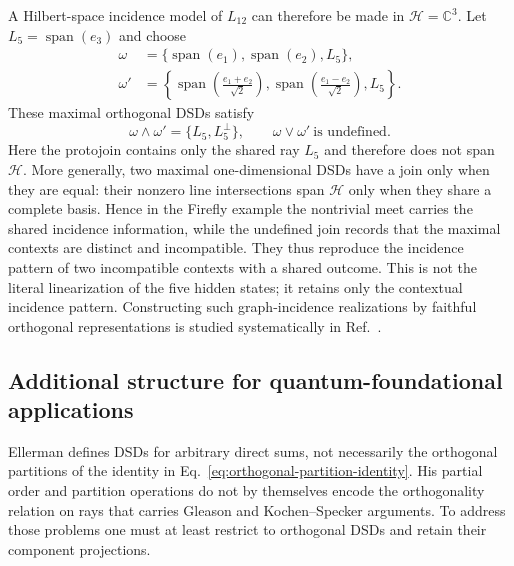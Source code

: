 \documentclass[aps,pra,reprint,nofootinbib]{revtex4-2}
\newcommand{\Span}{\operatorname{span}}
\begin{document}
A Hilbert-space incidence model of $L_{12}$ can therefore be made in
$\mathcal H=\mathbb C^3$.  Let $L_5=\Span(e_3)$ and choose
\begin{align}
  \omega&=\{\Span(e_1),\Span(e_2),L_5\},\\
  \omega'&=\left\{
  \Span\!\left(\frac{e_1+e_2}{\sqrt2}\right),
  \Span\!\left(\frac{e_1-e_2}{\sqrt2}\right),L_5\right\}.
  \label{eq:firefly-hilbert-contexts}
\end{align}
These maximal orthogonal DSDs satisfy
\begin{equation}
  \omega\wedge\omega'=\{L_5,L_5^\perp\},
  \qquad
  \omega\vee\omega'\ \text{is undefined}.
  \label{eq:hilbert-firefly-meet}
\end{equation}
Here the protojoin contains only the shared ray $L_5$ and therefore does not
span $\mathcal H$.  More generally, two maximal one-dimensional DSDs have a join only
when they are equal: their nonzero line intersections span $\mathcal H$ only when they
share a complete basis.  Hence in the Firefly example the nontrivial meet
carries the shared incidence information, while the undefined join records
that the maximal contexts are distinct and incompatible.
They thus reproduce the incidence pattern of two incompatible contexts with a
shared outcome.  This is not the literal linearization of the five hidden
states; it retains only the contextual incidence pattern.  Constructing such
graph-incidence realizations by faithful orthogonal representations is studied
systematically in Ref.~\cite{svozil-2018-b}.

\subsection{Additional structure for quantum-foundational applications}

Ellerman defines DSDs for arbitrary direct sums, not necessarily the
orthogonal partitions of the identity in
Eq.~\eqref{eq:orthogonal-partition-identity}.  His partial order and partition
operations do not by themselves encode the orthogonality relation on rays
that carries Gleason and Kochen--Specker arguments.  To address those problems
one must at least restrict to orthogonal DSDs and retain their component
projections.
\end{document}
